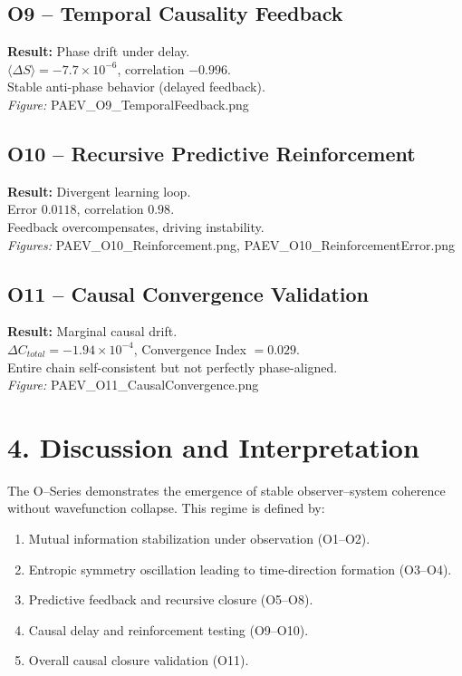\documentclass[12pt]{article}
\begin{document}
\subsection*{O9 – Temporal Causality Feedback}
\textbf{Result:} Phase drift under delay. \\
$\langle \Delta S \rangle=-7.7\times10^{-6}$, correlation $-0.996$. \\
Stable anti-phase behavior (delayed feedback). \\
\textit{Figure:} PAEV\_O9\_TemporalFeedback.png

\subsection*{O10 – Recursive Predictive Reinforcement}
\textbf{Result:} Divergent learning loop. \\
Error $0.0118$, correlation $0.98$. \\
Feedback overcompensates, driving instability. \\
\textit{Figures:} PAEV\_O10\_Reinforcement.png, PAEV\_O10\_ReinforcementError.png

\subsection*{O11 – Causal Convergence Validation}
\textbf{Result:} Marginal causal drift. \\
$\Delta C_{total}=-1.94\times10^{-4}$, Convergence Index $=0.029$. \\
Entire chain self-consistent but not perfectly phase-aligned. \\
\textit{Figure:} PAEV\_O11\_CausalConvergence.png

\section*{4. Discussion and Interpretation}
The O–Series demonstrates the emergence of stable observer–system coherence without wavefunction collapse.
This regime is defined by:
\begin{enumerate}
  \item Mutual information stabilization under observation (O1–O2).
  \item Entropic symmetry oscillation leading to time-direction formation (O3–O4).
  \item Predictive feedback and recursive closure (O5–O8).
  \item Causal delay and reinforcement testing (O9–O10).
  \item Overall causal closure validation (O11).
\end{enumerate}
\end{document}
